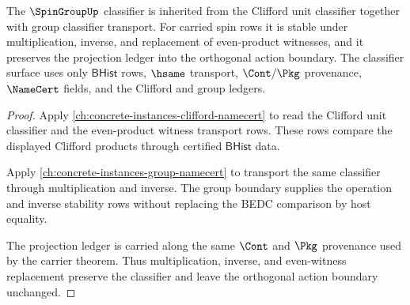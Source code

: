 \begin{theorem}
\label{thm:spingroup-even-product-classifier-obligation}
The $\SpinGroupUp$ classifier is inherited from the Clifford unit classifier
together with group classifier transport. For carried spin rows it is stable
under multiplication, inverse, and replacement of even-product witnesses, and
it preserves the projection ledger into the orthogonal action boundary. The
classifier surface uses only $\mathsf{BHist}$ rows, $\hsame$ transport,
$\Cont/\Pkg$ provenance, $\NameCert$ fields, and the Clifford and group ledgers.
\end{theorem}
\begin{proof}
Apply \autoref{ch:concrete-instances-clifford-namecert} to read the Clifford
unit classifier and the even-product witness transport rows. These rows compare
the displayed Clifford products through certified $\mathsf{BHist}$ data.

Apply \autoref{ch:concrete-instances-group-namecert} to transport the same
classifier through multiplication and inverse. The group boundary supplies the
operation and inverse stability rows without replacing the BEDC comparison by
host equality.

The projection ledger is carried along the same $\Cont$ and $\Pkg$ provenance
used by the carrier theorem. Thus multiplication, inverse, and even-witness
replacement preserve the classifier and leave the orthogonal action boundary
unchanged.
\end{proof}

